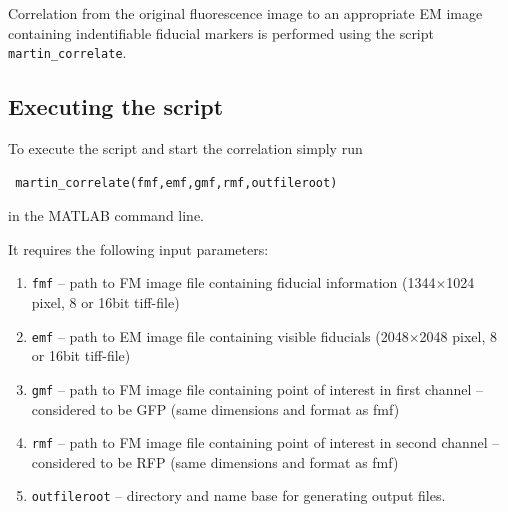 \documentclass[10pt,a4paper,onepage,DIV12]{scrartcl}
\begin{document}
Correlation from the original fluorescence image to an appropriate EM image containing indentifiable fiducial markers is performed using the script \texttt{martin\_correlate}.

\subsection{Executing the script}
To execute the script and start the correlation simply run \begin{verbatim}
 martin_correlate(fmf,emf,gmf,rmf,outfileroot)
\end{verbatim}
 in the MATLAB command line.
 
It requires the following input parameters:
\begin{enumerate}
 \item\texttt{fmf} -- path to FM image file containing fiducial information (1344$\times$1024 pixel, 8 or 16bit tiff-file)
 \item\texttt{emf} -- path to EM image file containing visible fiducials (2048$\times$2048 pixel, 8 or 16bit tiff-file)
 \item\texttt{gmf} -- path to FM image file containing point of interest in first channel -- considered to be GFP (same dimensions and format as fmf)
 \item\texttt{rmf} -- path to FM image file containing point of interest in second channel -- considered to be RFP (same dimensions and format as fmf)
 \item\texttt{outfileroot} -- directory and name base for generating output files.
\end{enumerate}
\newpage
\end{document}
